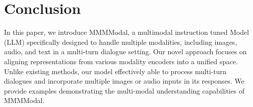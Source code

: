 \documentclass[preprint]{article}
\begin{document}
\section{Conclusion}

In this paper, we introduce MMMModal, a multimodal instruction tuned Model (LLM) specifically designed to handle multiple modalities, including images, audio, and text in a multi-turn dialogue setting. Our novel approach focuses on aligning representations from various modality encoders into a unified space. Unlike existing methods, our model effectively able to process multi-turn dialogues and incorporate multiple images or audio inputs in its responses. We provide examples demonstrating the multi-modal understanding capabilities of MMMModal.

{}

\end{document}
